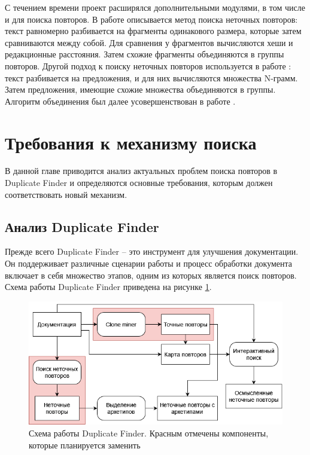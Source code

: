\documentclass[14pt]{matmex-diploma-custom}
\begin{document}
С течением времени проект расширялся дополнительными модулями, в том числе и для поиска повторов. В работе \cite{bib:tool:FuzzySearch} описывается метод поиска неточных повторов: текст равномерно разбивается на фрагменты одинакового размера, которые затем сравниваются между собой. Для сравнения у фрагментов вычисляются хеши и редакционные расстояния. Затем схожие фрагменты объединяются в группы повторов. Другой подход к поиску неточных повторов используется в работе \cite{bib:tool:NgramSearch}: текст разбивается на предложения, и для них вычисляются множества N-грамм. Затем предложения, имеющие схожие множества объединяются в группы. Алгоритм объединения был далее усовершенствован в работе \cite{bib:tool:ImprovedNgramSearch}.

\section{Требования к механизму поиска}

В данной главе приводится анализ актуальных проблем поиска повторов в Duplicate Finder и определяются основные требования, которым должен соответствовать новый механизм.

\subsection{Анализ Duplicate Finder}

Прежде всего Duplicate Finder -- это инструмент для улучшения документации. Он поддерживает различные сценарии работы и процесс обработки документа включает в себя множество этапов, одним из которых является поиск повторов. Схема работы Duplicate Finder приведена на рисунке \ref{fig:DuplicateFinder}.

\begin{figure}[h]
	\includegraphics[scale=0.65]{pictures/DuplicateFinder.png}
	\centering
	\caption{Схема работы Duplicate Finder. Красным отмечены компоненты, которые планируется заменить}
	\label{fig:DuplicateFinder}
\end{figure}
\end{document}

